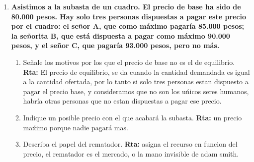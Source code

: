 \documentclass[12pt]{book}
\begin{document}
\begin{enumerate}
\item \textbf{Asistimos a la subasta de un cuadro. El precio de base ha sido de 80.000 pesos. Hay solo tres personas dispuestas a pagar este precio por el cuadro: el señor A, que como máximo pagaría 85.000 pesos; la señorita B, que está dispuesta a pagar como
máximo 90.000 pesos, y el señor C, que pagaría 93.000 pesos, pero no más.}
\begin{enumerate}
\item Señale los motivos por los que el precio de base no es el de equilibrio.
\textbf{Rta: }El precio de equilibrio, se da cuando la cantidad demandada es igual a la cantidad ofertada, por lo tanto si solo tres personas estan dispuesto a pagar el precio base, y consideramos que no son los u\'nicos seres humanos, habr\'ia otras personas que no estan dispuestas a pagar ese precio.
\item Indique un posible precio con el que acabará la subasta.
\textbf{Rta: }un precio ma\'ximo porque nadie pagar\'a mas.
\item Describa el papel del rematador.
\textbf{Rta: }asigna el recurso en funcion del precio, el rematador es el mercado, o la mano invisible de adam smith.
\end{enumerate}


\end{enumerate}
\end{document}
